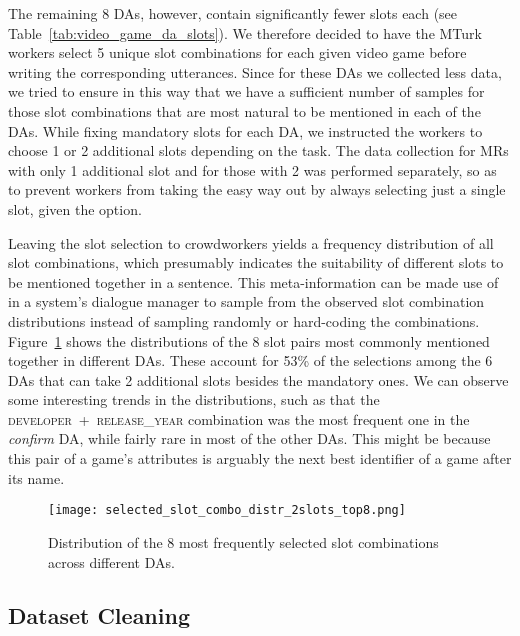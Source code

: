 \documentclass[11pt,a4paper]{article}
\begin{document}
The remaining 8 DAs, however, contain significantly fewer slots each (see Table~\ref{tab:video_game_da_slots}). We therefore decided to have the MTurk workers select 5 unique slot combinations for each given video game before writing the corresponding utterances. Since for these DAs we collected less data, we tried to ensure in this way that we have a sufficient number of samples for those slot combinations that are most natural to be mentioned in each of the DAs. While fixing mandatory slots for each DA, we instructed the workers to choose 1 or 2 additional slots depending on the task. The data collection for MRs with only 1 additional slot and for those with 2 was performed separately, so as to prevent workers from taking the easy way out by always selecting just a single slot, given the option.

Leaving the slot selection to crowdworkers yields a frequency distribution of all slot combinations, which presumably indicates the suitability of different slots to be mentioned together in a sentence. This meta-information can be made use of in a system's dialogue manager to sample from the observed slot combination distributions instead of sampling randomly or hard-coding the combinations. Figure~\ref{fig:selected_slot_combo_distr_2slots_top8} shows the distributions of the 8 slot pairs most commonly mentioned together in different DAs. These account for 53\% of the selections among the 6 DAs that can take 2 additional slots besides the mandatory ones. We can observe some interesting trends in the distributions, such as that the \textsc{developer~+~release\_year} combination was the most frequent one in the \emph{confirm} DA, while fairly rare in most of the other DAs. This might be because this pair of a game's attributes is arguably the next best identifier of a game after its name.


\begin{figure}
    \begin{center}
        \texttt{[image: selected\_slot\_combo\_distr\_2slots\_top8.png]}
    \end{center}
    \caption{Distribution of the 8 most frequently selected slot combinations across different DAs.}
    \label{fig:selected_slot_combo_distr_2slots_top8}
\end{figure}




\subsection{Dataset Cleaning}
\end{document}
